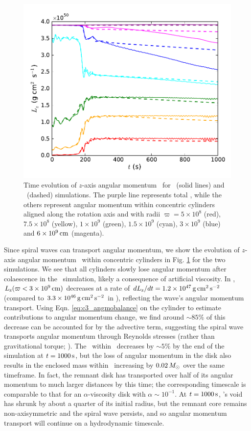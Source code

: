 \begin{figure}
\centering
\includegraphics[angle=0,width=0.6\columnwidth]{chapter3_zhu+u/figures/Lz.pdf}
\caption{Time evolution of $z$-axis angular momentum \Lz\ for \arepo\ (solid lines) and \gasoline\ (dashed) simulations.  The purple line represents total \Lz, while the others represent angular momentum within concentric cylinders aligned along the rotation axis and with radii $\varpi = 5\times10^8$ (red), $7.5\times10^8$ (yellow), $1\times10^9$ (green), $1.5\times10^9$ (cyan), $3\times10^9$ (blue) and $6\times10^9\,\mathrm{cm}$ (magenta).}
\label{fig:c3_angmo}
\end{figure}

Since spiral waves can transport angular momentum, we show the evolution of $z$-axis angular momentum \Lz\ within concentric cylinders in Fig. \ref{fig:c3_angmo} for the two simulations.  We see that all cylinders slowly lose angular momentum after colaescence in the \gasoline\ simulation, likely a consequence of artificial viscosity.  In \arepo, $\Lz(\varpi < 3\times10^9\,\mrm{cm})$ decreases at a rate of $d\Lz/dt = 1.2\times10^{47}\,\mrm{g}\,\mrm{cm}^2\,\mrm{s}^{-2}$ (compared to $3.3\times10^{46}\,\mathrm{g}\,\mathrm{cm}^2\,\mathrm{s}^{-2}$ in \gasoline), reflecting the wave's angular momentum transport.  Using Eqn. \ref{eq:c3_angmobalance} on the cylinder to estimate contributions to angular momentum change, we find around $\sim85$\% of this decrease can be accounted for by the advective term, suggesting the spiral wave transports angular momentum through Reynolds stresses (rather than gravitational torque; \citealt{kratl16}).  The \Lz\ within \innercyl\ decreases by $\sim5$\% by the end of the simulation at $t = 1000\,\mathrm{s}$, but the loss of angular momentum in the disk also results in the enclosed mass within \innercyl\ increasing by $0.02\,\Msun$ over the same timeframe.  In fact, the remnant disk has transported over half of its angular momentum to much larger distances by this time; the corresponding timescale is comparable to that for an $\alpha$-viscosity disk with $\alpha \sim 10^{-1}$.  At $t = 1000\,\mathrm{s}$, \arepo's void has shrunk by about a quarter of its initial radius, but the remnant core remains non-axisymmetric and the spiral wave persists, and so angular momentum transport will continue on a hydrodynamic timescale.

